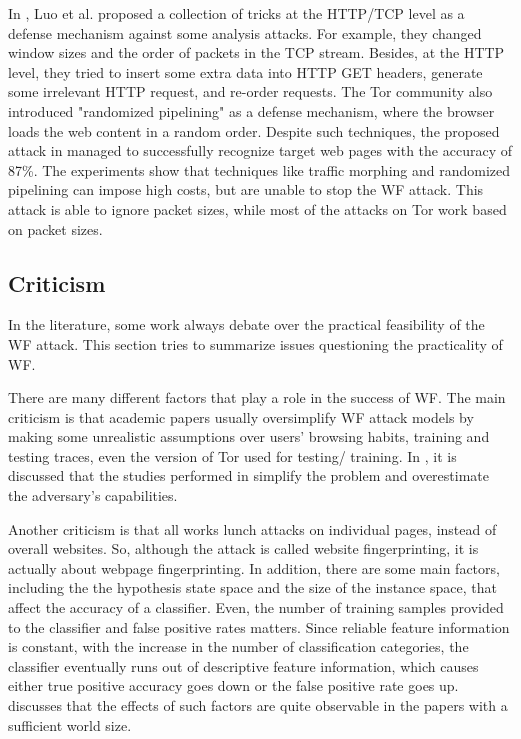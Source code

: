 In \cite{luo2011}, Luo et al. proposed a collection of tricks at the HTTP/TCP level as a defense mechanism against some analysis attacks. For example, they changed window sizes and the order of packets in the TCP stream. Besides, at the HTTP level, they tried to insert some extra data into HTTP GET headers, generate some irrelevant HTTP request, and re-order requests. The Tor community also introduced "randomized pipelining" \cite{perry11} as a defense mechanism, where the browser loads the web content in a random order. Despite such techniques, the proposed attack in \cite{cai2012touching} managed to successfully recognize target web pages with the accuracy of 87\%. The experiments show that techniques like traffic morphing and randomized pipelining can impose high costs, but are unable to stop the WF attack. This attack is able to ignore packet sizes, while most of the attacks on Tor work based on packet sizes.

\subsection{Criticism}
In the literature, some work always debate over the practical feasibility of the WF attack. This section tries to summarize issues questioning the practicality of WF.

There are many different factors that play a role in the success of WF. The main criticism is that academic papers usually oversimplify WF attack models by making some unrealistic assumptions over users' browsing habits, training and testing traces, even the version of Tor used for testing/ training. In \cite{juarez14}, it is discussed that the studies performed in \cite{cai2012touching, herrmann2009, panchenko11, wang2013improved, shi2009} simplify the problem and overestimate the adversary's capabilities.

Another criticism is that all works lunch attacks on individual pages, instead of overall websites. So, although the attack is called website fingerprinting, it is actually about webpage fingerprinting. In addition, there are some main factors, including the the hypothesis state space and the size of the instance space, that affect the accuracy of a classifier. Even, the number of training samples provided to the classifier and false positive rates matters. Since reliable feature information is constant, with the increase in the number of classification categories, the classifier eventually runs out of descriptive feature information, which causes either true positive accuracy goes down or the false positive rate goes up. \cite{TorBlog} discusses that the effects of such factors are quite observable in the papers with a sufficient world size.

